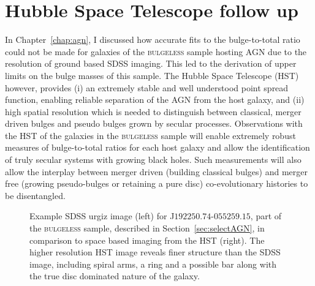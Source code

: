 \section{Hubble Space Telescope follow up}\label{sec:hst}

In Chapter~\ref{chap:agn}, I discussed how accurate fits to the bulge-to-total ratio could not be made for galaxies of the \textsc{bulgeless} sample hosting AGN due to the resolution of ground based SDSS imaging. This led to the derivation of upper limits on the bulge masses of this sample. The Hubble Space Telescope (HST) however, provides (i) an extremely stable and well understood point spread function, enabling reliable separation of the AGN from the host galaxy, and (ii) high spatial resolution which is needed to distinguish between classical, merger driven bulges and pseudo bulges grown by secular processes. Observations with the HST of the galaxies in the \textsc{bulgeless} sample will enable extremely robust measures of bulge-to-total ratios for each host galaxy and allow the identification of truly secular systems with growing black holes. Such measurements will also allow the interplay between merger driven (building classical bulges) and merger free (growing pseudo-bulges or retaining a pure disc) co-evolutionary histories to be disentangled. 

\begin{figure}
\caption[Example HST image data in comparison to SDSS]{Example SDSS urgiz image (left) for J$192250.74$-$055259.15$, part of the \textsc{bulgeless} sample, described in Section~\ref{sec:selectAGN}, in comparison to space based imaging from the HST (right). The higher resolution HST image reveals finer structure than the SDSS image, including spiral arms, a ring and a possible bar along with the true disc dominated nature of the galaxy.}
\label{fig:hstdata}
\end{figure}

